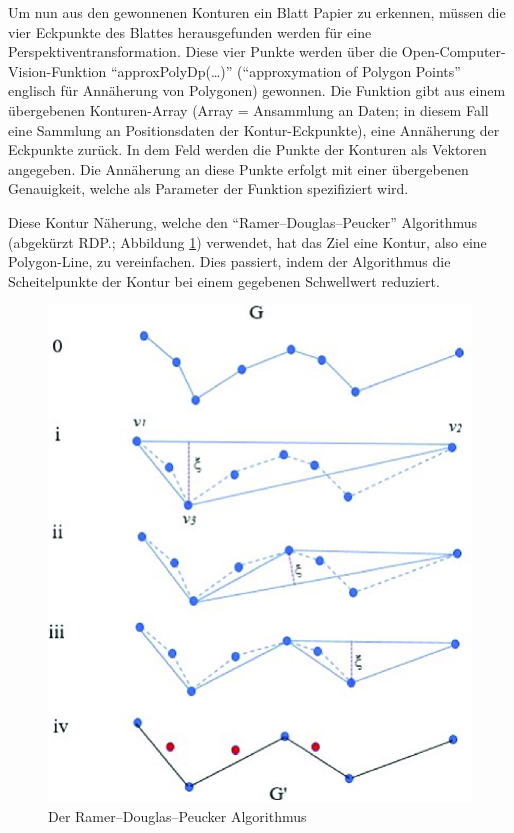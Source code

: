 
Um nun aus den gewonnenen Konturen ein Blatt Papier zu erkennen, müssen die vier Eckpunkte des Blattes herausgefunden werden für eine Perspektiventransformation. Diese vier Punkte werden über die Open-Computer-Vision-Funktion ``approxPolyDp(\dots)'' (``approxymation of Polygon Points'' englisch für Annäherung von Polygonen) gewonnen. Die Funktion gibt aus einem übergebenen Konturen-Array (Array = Ansammlung an Daten; in diesem Fall eine Sammlung an Positionsdaten der Kontur-Eckpunkte), eine Annäherung der Eckpunkte zurück. In dem Feld werden die Punkte der Konturen als Vektoren angegeben. Die Annäherung an diese Punkte erfolgt mit einer übergebenen Genauigkeit, welche als Parameter der Funktion spezifiziert wird.

Diese Kontur Näherung, welche den ``Ramer–Douglas–Peucker'' Algorithmus (abgekürzt RDP.; Abbildung \ref{fig:map:rdpalgo}) verwendet, hat das Ziel eine Kontur, also eine Polygon-Line, zu vereinfachen. Dies passiert, indem der Algorithmus die Scheitelpunkte der Kontur bei einem gegebenen Schwellwert reduziert.


\begin{figure}[H]
    \centering
    \includegraphics[scale=0.5]{pics/bildverarbeitungsalgos/The-Ramer-Douglas-Peucker-algorithm.png}
    \caption{Der Ramer–Douglas–Peucker Algorithmus}
    \label{fig:map:rdpalgo}
\end{figure}

